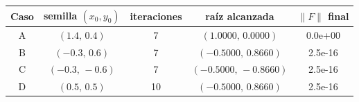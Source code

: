 \begin{tabular}{c c c c c}
\toprule
Caso & semilla $(x_0,y_0)$ & iteraciones & raíz alcanzada & $\|F\|$ final\\
\midrule
A & $(1.4,\,0.4)$ & 7 & $(1.0000,\,0.0000)$ & 0.0e+00\\
B & $(-0.3,\,0.6)$ & 7 & $(-0.5000,\,0.8660)$ & 2.5e-16\\
C & $(-0.3,\,-0.6)$ & 7 & $(-0.5000,\,-0.8660)$ & 2.5e-16\\
D & $(0.5,\,0.5)$ & 10 & $(-0.5000,\,0.8660)$ & 2.5e-16\\
\bottomrule
\end{tabular}
